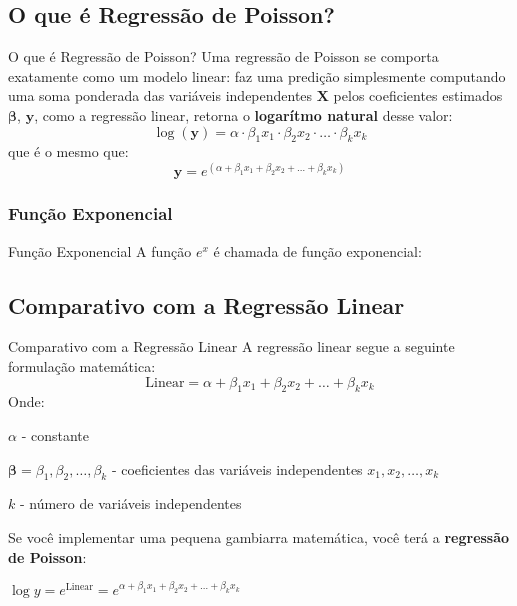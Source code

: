 \subsection{O que é Regressão de Poisson?}
\begin{frame}{O que é Regressão de Poisson?}
	Uma regressão de Poisson se comporta exatamente como um modelo linear:
	faz uma predição simplesmente computando uma soma ponderada das variáveis
	independentes $\mathbf{X}$ pelos coeficientes estimados $\boldsymbol{\beta}$,
	$\boldsymbol{y}$, como a regressão linear, retorna o \textbf{logarítmo natural}
	desse valor:
	$$
		\log(\boldsymbol{y})= \alpha \cdot \beta_1 x_1 \cdot \beta_2 x_2 \cdot \ldots \cdot \beta_k x_k
	$$
	que é o mesmo que:
	$$
		\boldsymbol{y} = e^{(\alpha + \beta_1 x_1 + \beta_2 x_2 + \ldots + \beta_k x_k)}
	$$
\end{frame}

\subsubsection{Função Exponencial}
\begin{frame}{Função Exponencial}
	A função $e^x$ é chamada de função exponencial:
\end{frame}

\subsection{Comparativo com a Regressão Linear}
\begin{frame}{Comparativo com a Regressão Linear}
	A regressão linear segue a seguinte formulação matemática:
	\small
	$$
		\text{Linear} = \alpha + \beta_1 x_1 + \beta_2 x_2 + \ldots + \beta_k x_k
	$$
	Onde:
	\begin{vfilleditems}
		\item \small $\alpha$ - constante
		\item \small $\boldsymbol{\beta} = \beta_1, \beta_2, \dots, \beta_k$ - coeficientes das variáveis independentes $x_1, x_2, \dots, x_k$
		\item \small $k$ - número de variáveis independentes
	\end{vfilleditems}
	Se você implementar uma pequena gambiarra matemática, você terá a \textbf{regressão de Poisson}:
	\begin{vfilleditems}
		\item \small $\log{y} = e^{\text{Linear}} = e^{\alpha + \beta_1 x_1 + \beta_2 x_2 + \ldots + \beta_k x_k}$
	\end{vfilleditems}
\end{frame}

